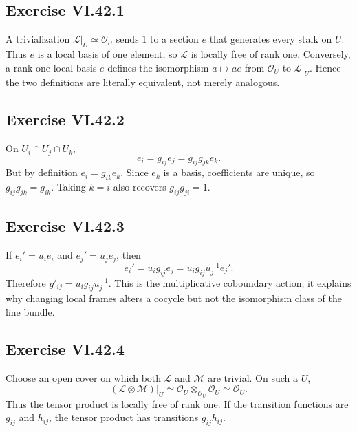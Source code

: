 \subsection*{Exercise VI.42.1}
\begin{solution}
A trivialization \(\mathcal L|_U\simeq\mathcal O_U\) sends \(1\) to a section \(e\) that generates every stalk on \(U\).  Thus \(e\) is a local basis of one element, so \(\mathcal L\) is locally free of rank one.  Conversely, a rank-one local basis \(e\) defines the isomorphism \(a\mapsto ae\) from \(\mathcal O_U\) to \(\mathcal L|_U\).  Hence the two definitions are literally equivalent, not merely analogous.
\end{solution}

\subsection*{Exercise VI.42.2}
\begin{solution}
On \(U_i\cap U_j\cap U_k\),
\[
e_i=g_{ij}e_j=g_{ij}g_{jk}e_k.
\]
But by definition \(e_i=g_{ik}e_k\).  Since \(e_k\) is a basis, coefficients are unique, so \(g_{ij}g_{jk}=g_{ik}\).  Taking \(k=i\) also recovers \(g_{ij}g_{ji}=1\).
\end{solution}

\subsection*{Exercise VI.42.3}
\begin{solution}
If \(e_i'=u_ie_i\) and \(e_j'=u_je_j\), then
\[
e_i'=u_i g_{ij}e_j=u_ig_{ij}u_j^{-1}e_j'.
\]
Therefore \(g'_{ij}=u_i g_{ij}u_j^{-1}\).  This is the multiplicative coboundary action; it explains why changing local frames alters a cocycle but not the isomorphism class of the line bundle.
\end{solution}

\subsection*{Exercise VI.42.4}
\begin{solution}
Choose an open cover on which both \(\mathcal L\) and \(\mathcal M\) are trivial.  On such a \(U\),
\[
(\mathcal L\otimes\mathcal M)|_U\simeq\mathcal O_U\otimes_{\mathcal O_U}\mathcal O_U\simeq\mathcal O_U.
\]
Thus the tensor product is locally free of rank one.  If the transition functions are \(g_{ij}\) and \(h_{ij}\), the tensor product has transitions \(g_{ij}h_{ij}\).
\end{solution}

